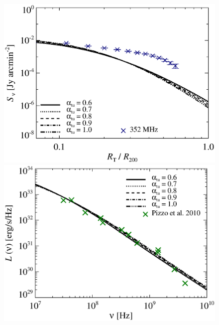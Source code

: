 \documentclass[fleqn,usenatbib,useAMS]{mnras}
\newcommand{\Mflatturb}{{\it M-turbulence}\xspace}
\begin{document}
\begin{figure}
\begin{minipage}{1\columnwidth}
\end{minipage}
\\
\begin{minipage}{1\columnwidth}
  \begin{center}%
    \includegraphics[width=\columnwidth]{tcltD.prof.comp.KrTTDth.aI0.eps}
  \end{center}
\end{minipage}
\begin{minipage}{1\columnwidth}
   \begin{center}%
     \includegraphics[width=\columnwidth]{tcltD.spec.comp.KrTTDth.aI0.eps}

\end{center}
\end{minipage}
\end{figure}
\end{document}
